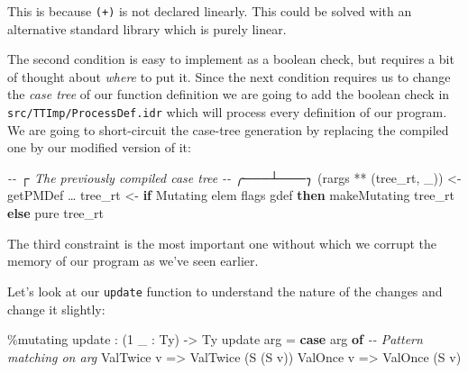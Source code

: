 \documentclass[
]{article}
\newenvironment{Shaded}{}{}
\newcommand{\CommentTok}[1]{\textcolor[rgb]{0.38,0.63,0.69}{\textit{#1}}}
\newcommand{\DataTypeTok}[1]{\textcolor[rgb]{0.56,0.13,0.00}{#1}}
\newcommand{\DecValTok}[1]{\textcolor[rgb]{0.25,0.63,0.44}{#1}}
\newcommand{\FunctionTok}[1]{\textcolor[rgb]{0.02,0.16,0.49}{#1}}
\newcommand{\KeywordTok}[1]{\textcolor[rgb]{0.00,0.44,0.13}{\textbf{#1}}}
\newcommand{\NormalTok}[1]{#1}
\newcommand{\OperatorTok}[1]{\textcolor[rgb]{0.40,0.40,0.40}{#1}}
\newcommand{\OtherTok}[1]{\textcolor[rgb]{0.00,0.44,0.13}{#1}}
\begin{document}
This is because \texttt{(+)} is not declared linearly. This could be
solved with an alternative standard library which is purely linear.

The second condition is easy to implement as a boolean check, but
requires a bit of thought about \emph{where} to put it. Since the next
condition requires us to change the \emph{case tree} of our function
definition we are going to add the boolean check in
\texttt{src/TTImp/ProcessDef.idr} which will process every definition of
our program. We are going to short-circuit the case-tree generation by
replacing the compiled one by our modified version of it:

\begin{Shaded}
\begin{Highlighting}[]
\CommentTok{{-}{-}            ┌ The previously compiled case tree}
\CommentTok{{-}{-}        ╭───┴───╮}
\NormalTok{(rargs }\OperatorTok{**}\NormalTok{ (tree\_rt\textquotesingle{}, \_)) }\OtherTok{\textless{}{-}}\NormalTok{ getPMDef …}
\NormalTok{tree\_rt }\OtherTok{\textless{}{-}} \KeywordTok{if} \DataTypeTok{Mutating} \OtherTok{\textasciigrave{}elem\textasciigrave{}}\NormalTok{ flags gdef}
              \KeywordTok{then}\NormalTok{ makeMutating tree\_rt\textquotesingle{}}
              \KeywordTok{else} \FunctionTok{pure}\NormalTok{ tree\_rt\textquotesingle{}}
\end{Highlighting}
\end{Shaded}

The third constraint is the most important one without which we corrupt
the memory of our program as we've seen earlier.

Let's look at our \texttt{update} function to understand the nature of
the changes and change it slightly:

\begin{Shaded}
\begin{Highlighting}[]
\OperatorTok{\%}\NormalTok{mutating}
\NormalTok{update }\OperatorTok{:}\NormalTok{ (}\DecValTok{1}\NormalTok{ \_ }\OperatorTok{:} \DataTypeTok{Ty}\NormalTok{) }\OtherTok{{-}\textgreater{}} \DataTypeTok{Ty}
\NormalTok{update arg }\OtherTok{=} \KeywordTok{case}\NormalTok{ arg }\KeywordTok{of} \CommentTok{{-}{-} Pattern matching on arg}
                  \DataTypeTok{ValTwice}\NormalTok{ v }\OtherTok{=\textgreater{}} \DataTypeTok{ValTwice}\NormalTok{ (}\DataTypeTok{S}\NormalTok{ (}\DataTypeTok{S}\NormalTok{ v))}
                  \DataTypeTok{ValOnce}\NormalTok{ v }\OtherTok{=\textgreater{}} \DataTypeTok{ValOnce}\NormalTok{ (}\DataTypeTok{S}\NormalTok{ v)}
\end{Highlighting}
\end{Shaded}
\end{document}
